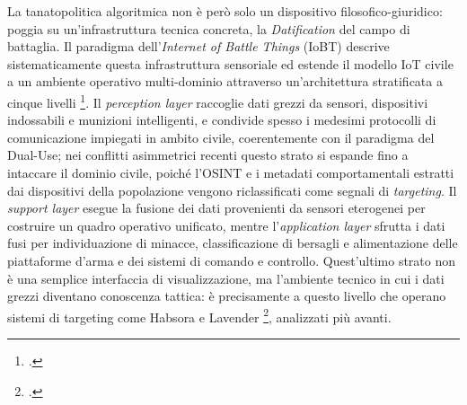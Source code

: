 \documentclass[a4paper,12pt]{report}
\begin{document}
La tanatopolitica algoritmica non è però solo un dispositivo filosofico-giuridico:
poggia su un'infrastruttura tecnica concreta, la \textit{Datification} del campo
di battaglia. Il paradigma dell'\textit{Internet of Battle Things} (IoBT)
descrive sistematicamente questa infrastruttura sensoriale ed estende il modello
IoT civile a un ambiente operativo multi-dominio attraverso un'architettura
stratificata a cinque livelli \footcite{kufakunesu_2025_iobt}. Il
\textit{perception layer} raccoglie dati grezzi da sensori, dispositivi
indossabili e munizioni intelligenti, e condivide spesso i medesimi protocolli
di comunicazione impiegati in ambito civile, coerentemente con il paradigma del
Dual-Use; nei conflitti asimmetrici recenti questo strato si espande fino a
intaccare il dominio civile, poiché l'OSINT e i metadati comportamentali estratti
dai dispositivi della popolazione vengono riclassificati come segnali di
\textit{targeting}. Il \textit{support layer} esegue la fusione dei dati
provenienti da sensori eterogenei per costruire un quadro operativo unificato,
mentre l'\textit{application layer} sfrutta i dati fusi per individuazione di
minacce, classificazione di bersagli e alimentazione delle piattaforme d'arma e
dei sistemi di comando e controllo. Quest'ultimo strato non è una semplice
interfaccia di visualizzazione, ma l'ambiente tecnico in cui i dati grezzi
diventano conoscenza tattica: è precisamente a questo livello che operano sistemi
di targeting come Habsora e Lavender \footcite{oliveri_2024}, analizzati più
avanti.
\end{document}
